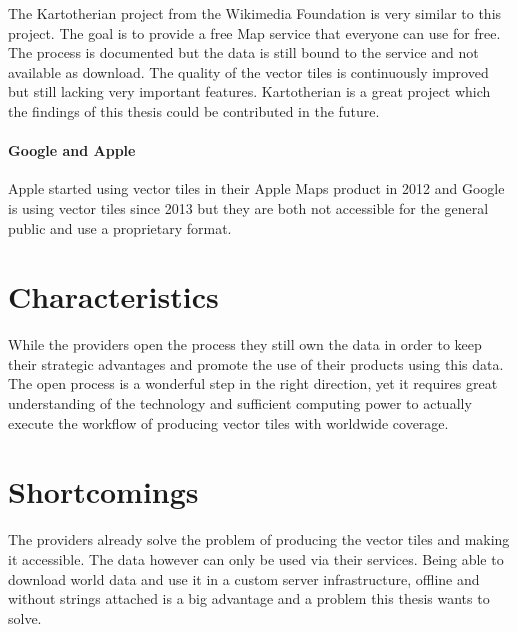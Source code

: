 The Kartotherian\cite{9_mediawiki.org_2015} project from the Wikimedia Foundation\cite{10_wikimediafoundation.org_2015} is very similar to this project.
The goal is to provide a free Map service that everyone can use for free.
The process is documented but the data is still bound to the service and not available as download.
The quality of the vector tiles is continuously improved but still lacking very important features.
Kartotherian is a great project which the findings of this thesis could be contributed in the future.

\paragraph{Google and Apple}

Apple started using vector tiles in their Apple Maps product in 2012\cite{wiki:apple-maps}  and  Google is using vector tiles since 2013\cite{wiki:google-maps} but they are both not accessible for the general public and use a proprietary format. 

\section{Characteristics}

While the providers open the process they still own the data in order to keep their strategic advantages and promote the use of their products using this data.
The open process is a wonderful step in the right direction, yet it requires great understanding
of the technology and sufficient computing power to actually
execute the workflow of producing vector tiles with worldwide coverage.

\section{Shortcomings}

The providers already solve the problem of producing the vector tiles
and making it accessible. The data however can only be used
via their services.
\newline{}
Being able to download world data and use it in a custom server
infrastructure, offline and without strings attached is a big advantage
and a problem this thesis wants to solve.

\newpage